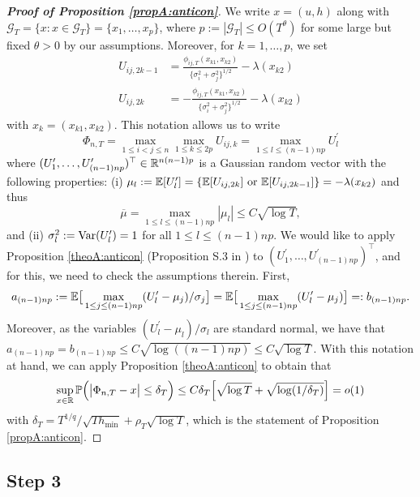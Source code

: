 \documentclass[a4paper,12pt]{article}
\begin{document}
\begin{proof}[\textnormal{\textbf{Proof of Proposition \ref{propA:anticon}}}] 

We write $x = (u,h)$ along with $\mathcal{G}_T = \{ x : x \in \mathcal{G}_T \} = \{x_1,\ldots,x_p\}$, where $p := |\mathcal{G}_T| \le O(T^\theta)$ for some large but fixed $\theta > 0$ by our assumptions. Moreover, for $k = 1,\ldots,p$, we set 
\begin{align*}
U_{ij, 2k-1} & = \frac{\phi_{ij, T}(x_{k1},x_{k2})}{\{{\sigma}_i^2 + {\sigma}_j^2\}^{1/2}} - \lambda(x_{k2}) \\
U_{ij, 2k} & = -\frac{\phi_{ij, T}(x_{k1},x_{k2})}{\{{\sigma}_i^2 + {\sigma}_j^2\}^{1/2}} - \lambda(x_{k2}) 
\end{align*}
with $x_k = (x_{k1},x_{k2})$. This notation allows us to write
\[ \Phi_{n, T} = \max_{1\le i < j \le n} \max_{1 \le k \le 2p} U_{ij, k} = \max_{1 \leq l \leq (n-1)np} U^\prime_l\]
where $(U^\prime_{1},\ldots,U^\prime_{(n-1)np})^\top \in \mathbb{R}^{n(n-1)p}$ is a Gaussian random vector with the following properties: (i) $\mu_{l} := \mathbb{E}[U^\prime_l] = \{\mathbb{E}[U_{ij, 2k}] \text{ or }\mathbb{E}[U_{ij, 2k-1}]\}= - \lambda(x_{k2}) $ and thus
$$\overline{\mu} = \max_{1\leq l \leq (n-1)np} |\mu_{l}| \leq C \sqrt{\log T},$$
and (ii) $\sigma_{l}^2 := \textnormal{Var}(U^\prime_{l}) = 1$ for all $1 \leq l \leq (n-1)np$. We would like to apply \linebreak Proposition \ref{theoA:anticon} (Proposition S.3 in \cite{KhismatullinaVogt2020}) to  $(U^\prime_{1},\ldots,U^\prime_{(n-1)np})^\top$, and for this, we need to check the assumptions therein. First, 
$$a_{(n-1)np} := \mathbb{E}\big[ \max_{1 \le j \le (n-1)np} (U_l^\prime -\mu_j)/\sigma_j \big] =\mathbb{E}\big[ \max_{1 \le j \le (n-1)np} (U_l^\prime-\mu_j) \big] = : b_{(n-1)np}.$$ Moreover, as the variables $(U^\prime_l - \mu_l)/\sigma_l$ are standard normal, we have that \linebreak $a_{(n-1)np} = b_{(n-1)np} \le C\sqrt{\log ((n-1)np)} \leq C \sqrt{\log T}$. With this notation at hand, we can apply Proposition \ref{theoA:anticon} to obtain that 
\[ \sup_{x \in \mathbb{R}} \mathbb{P} \Big( \big| \Phi_{n, T} - x \big| \le \delta_T \Big) \le C \delta_T \Big[ \sqrt{\log T} + \sqrt{ \log(1/\delta_T) } \Big] = o(1) \]
with $\delta_T = T^{1/q} / \sqrt{T h_{\min}} + \rho_T \sqrt{\log T}$, which is the statement of Proposition \ref{propA:anticon}.
\end{proof}

\subsection*{Step 3}
\end{document}
